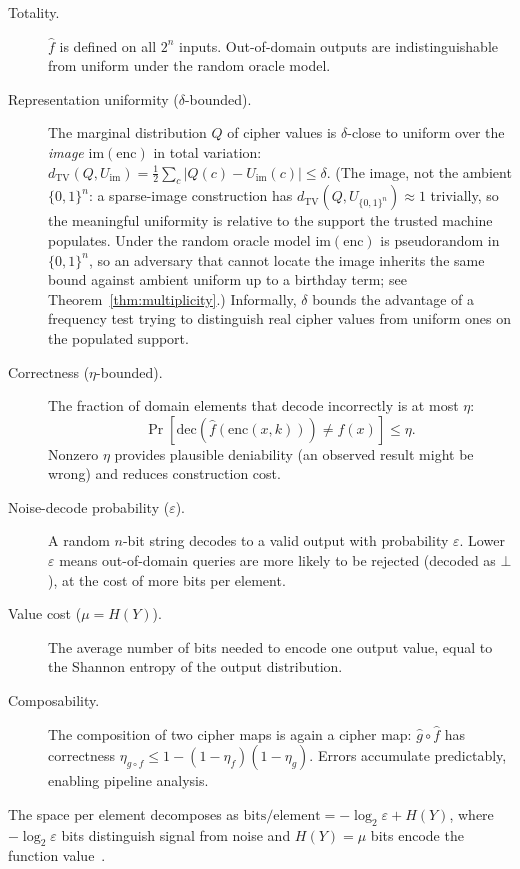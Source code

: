 \documentclass[conference]{IEEEtran}
\theoremstyle{definition}
\theoremstyle{plain}
\theoremstyle{remark}
\newcommand{\fhat}{\hat{f}}
\newcommand{\ghat}{\hat{g}}
\newcommand{\enc}{\mathrm{enc}}
\newcommand{\dec}{\mathrm{dec}}
\newcommand{\TV}{d_{\mathrm{TV}}}
\newcommand{\B}{\{0,1\}}
\begin{document}
\begin{description}
\item[Totality.]  $\fhat$ is defined on all $2^n$ inputs.  Out-of-domain
  outputs are indistinguishable from uniform under the random oracle
  model.

\item[Representation uniformity ($\delta$-bounded).]  The marginal
  distribution $Q$ of cipher values is $\delta$-close to uniform over the
  \emph{image} $\mathrm{im}(\enc)$ in total variation:
  $\TV(Q, U_{\mathrm{im}}) = \frac{1}{2}\sum_c |Q(c) - U_{\mathrm{im}}(c)|
  \leq \delta$.  (The image, not the ambient $\B^n$: a sparse-image
  construction has $\TV(Q, U_{\B^n}) \approx 1$ trivially, so the
  meaningful uniformity is relative to the support the trusted machine
  populates.  Under the random oracle model $\mathrm{im}(\enc)$ is
  pseudorandom in $\B^n$, so an adversary that cannot locate the image
  inherits the same bound against ambient uniform up to a birthday term;
  see Theorem~\ref{thm:multiplicity}.)  Informally, $\delta$ bounds the
  advantage of a frequency test trying to distinguish real cipher values
  from uniform ones on the populated support.

\item[Correctness ($\eta$-bounded).]  The fraction of domain elements
  that decode incorrectly is at most $\eta$:
  \[
  \Pr[\dec(\fhat(\enc(x,k))) \neq f(x)] \leq \eta.
  \]
  Nonzero $\eta$ provides plausible deniability (an observed result might
  be wrong) and reduces construction cost.

\item[Noise-decode probability ($\varepsilon$).]  A random $n$-bit
  string decodes to a valid output with probability $\varepsilon$.
  Lower $\varepsilon$ means out-of-domain queries are more likely to be
  rejected (decoded as $\bot$), at the cost of more bits per element.

\item[Value cost ($\mu = H(Y)$).]  The average number of bits needed to
  encode one output value, equal to the Shannon entropy of the output
  distribution.

\item[Composability.]  The composition of two cipher maps is again a
  cipher map: $\ghat \circ \fhat$ has correctness
  $\eta_{g \circ f} \leq 1 - (1 - \eta_f)(1 - \eta_g)$.
  Errors accumulate predictably, enabling pipeline analysis.
\end{description}

The space per element decomposes as
$\text{bits/element} = -\log_2 \varepsilon + H(Y)$, where
$-\log_2 \varepsilon$ bits distinguish signal from noise and
$H(Y) = \mu$ bits encode the function
value~\cite[Thm.~6.1]{towell2026cipher}.
\end{document}
